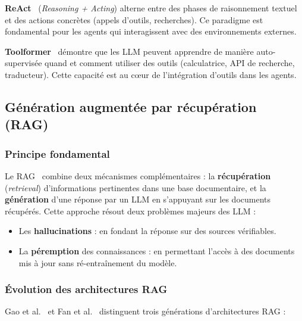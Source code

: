 \documentclass[12pt, a4paper]{article}
\newcommand{\acrshort}[1]{\MakeUppercase{#1}}
\begin{document}
\textbf{ReAct}~\cite{yao2023react} (\textit{Reasoning + Acting}) alterne entre des phases de raisonnement textuel et des actions concrètes (appels d'outils, recherches). Ce paradigme est fondamental pour les agents qui interagissent avec des environnements externes.

\textbf{Toolformer}~\cite{schick2023toolformer} démontre que les \acrshort{llm} peuvent apprendre de manière auto-supervisée quand et comment utiliser des outils (calculatrice, API de recherche, traducteur). Cette capacité est au c\oe{}ur de l'intégration d'outils dans les agents.

\subsection{Génération augmentée par récupération (RAG)}
\label{sec:rag_etat_art}

\subsubsection{Principe fondamental}

Le \acrshort{rag}~\cite{lewis2020rag} combine deux mécanismes complémentaires : la \textbf{récupération} (\textit{retrieval}) d'informations pertinentes dans une base documentaire, et la \textbf{génération} d'une réponse par un \acrshort{llm} en s'appuyant sur les documents récupérés. Cette approche résout deux problèmes majeurs des \acrshort{llm} :

\begin{itemize}
  \item Les \textbf{hallucinations} : en fondant la réponse sur des sources vérifiables.
  \item La \textbf{péremption} des connaissances : en permettant l'accès à des documents mis à jour sans ré-entraînement du modèle.
\end{itemize}

\subsubsection{Évolution des architectures RAG}

Gao et al.~\cite{gao2023ragsurvey} et Fan et al.~\cite{fan2024survey} distinguent trois générations d'architectures RAG :
\end{document}
